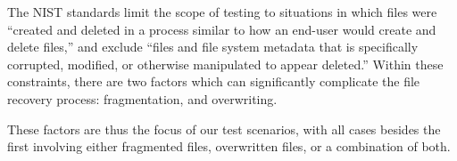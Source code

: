 The NIST standards limit the scope of testing to situations in which files were ``created and deleted in a process similar to how an end-user would create and delete files,''\cite{meta:dfr:standards} and  exclude ``files and file system metadata that is specifically corrupted, modified, or otherwise manipulated to appear deleted.''\cite{meta:dfr:standards}
Within these constraints, there are two factors which can significantly complicate the file recovery process: fragmentation, and overwriting. 

These factors are thus the focus of our test scenarios, with all cases besides the first involving either fragmented files, overwritten files, or a combination of both.

